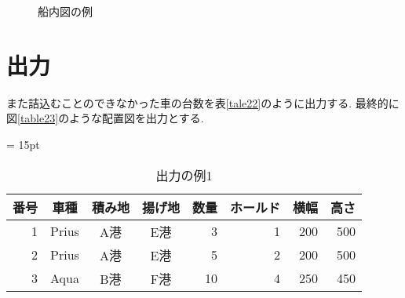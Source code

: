 \begin{figure}[htbt]
    \caption{船内図の例}
    \label{figure22}
\end{figure}

\section{出力}
また詰込むことのできなかった車の台数を表\ref{tale22}のように出力する. 
最終的に図\ref{table23}のような配置図を出力とする. 

\begin{table}[htbp]
    \tabcolsep = 15pt
    \renewcommand{\arraystretch}{0.8}
    \caption{出力の例1}
    \label{table22}
    \begin{center}
    \begin{tabular}{rcccrrrr} \hline
    番号 & 車種 & 積み地 & 揚げ地 & 数量 & ホールド & 横幅 & 高さ \\ \hline
    1 & Prius & A港 & E港 & 3 & 1 & 200 & 500 \\
    2 & Prius & A港 & E港 & 5 & 2 & 200 & 500 \\
    3 & Aqua & B港 & F港 & 10 & 4 & 250 & 450 \\
    \hline
    \end{tabular}
    \end{center}
    \end{table}
